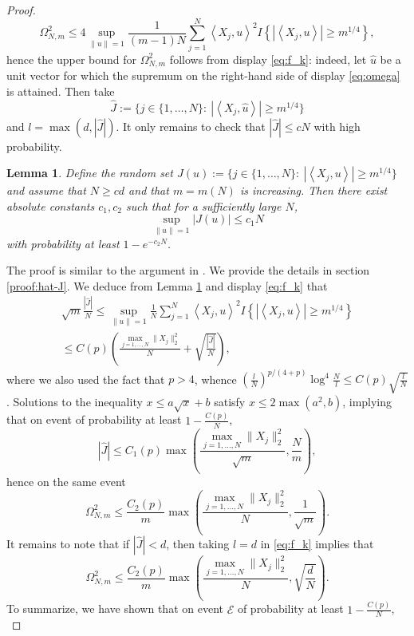 \documentclass[12pt]{article}
\def\l{\left}
\def\r{\right}
\newcommand{\m}{\mathcal}
\newcommand{\dotp}[2]{\left\langle#1,#2\right\rangle}
\newtheorem{lemma}{Lemma}
\theoremstyle{thmstyletwo}%
\theoremstyle{thmstylethree}%
\begin{document}
\begin{proof}
\begin{equation}
    \label{eq:omega}
\Omega^2_{N,m} \leq 4\sup_{\|u\|=1}\frac{1}{(m-1)N}\sum_{j=1}^N \dotp{X_j}{u}^2 I\l\{ |\dotp{X_j}{u}|\geq m^{1/4}\r\},
\end{equation}
hence the upper bound for $\Omega^2_{N,m}$ follows from display \eqref{eq:f_k}: indeed, let $\hat u$ be a unit vector for which the supremum on the right-hand side of display \eqref{eq:omega} is attained. Then take 
\[
\hat J:=\{ j\in\{1,\ldots,N\}: \ |\dotp{X_j}{\hat u}|\geq m^{1/4} \}
\]
and $l=\max(d,|\hat J|)$. It only remains to check that $|\hat J|\leq cN$ with high probability. 
\begin{lemma}
\label{lemma:hat-J}
    Define the random set $J(u):=\{ j\in\{1,\ldots,N\}: \ |\dotp{X_j}{u}|\geq m^{1/4} \}$ and assume that $N\geq cd$ and that $m=m(N)$ is increasing. Then there exist absolute constants $c_1,c_2$ such that for a sufficiently large $N$, 
    \[
    \sup_{\|u\|=1}|J(u)|\leq c_1N
    \]
    with probability at least $1-e^{-c_2N}$.
\end{lemma}
\noindent The proof is similar to the argument in \citep[Theorem 3.1]{jirak2025concentration}. We provide the details in section \ref{proof:hat-J}. We deduce from Lemma \ref{lemma:hat-J} and display \eqref{eq:f_k} that 
\begin{multline*}
    \sqrt{m} \frac{|\hat J|}{N} \leq \sup_{\|u\|=1}\frac{1}{N}\sum_{j=1}^N \dotp{X_j}{u}^2 I\l\{ |\dotp{X_j}{u}|\geq m^{1/4}\r\} 
    \\
    \leq 
C(p)\left(\frac{\max_{j=1,\ldots,N} \|X_j\|_2^2}{N} + \sqrt{\frac{|\hat J|}{N}}\right), 
\end{multline*}
where we also used the fact that $p>4$, whence $\left(\frac{l}{N}\right)^{p/(4+p)} \log^4 \frac{N}{l}\leq C(p) \sqrt{\frac{l}{N}}$. 
Solutions to the inequality $x \leq a\sqrt{x} + b$ satisfy $x\leq 2\max(a^2, b)$, implying that on event of probability at least $1-\frac{C(p)}{N}$,
\[
|\hat J| \leq C_1(p)\max\l(\frac{\max_{j=1,\ldots,N} \|X_j\|_2^2}{\sqrt m}, \frac{N}{m} \r), 
\]
hence on the same event 
\[
\Omega^2_{N,m} \leq \frac{C_2(p)}{m}\max\l(\frac{\max_{j=1,\ldots,N} \|X_j\|_2^2}{N}, \frac{1}{\sqrt m} \r).
\]
It remains to note that if $|\hat J|<d$, then taking $l=d$ in \eqref{eq:f_k} implies that 
\[
\Omega^2_{N,m}\leq \frac{C_2(p)}{m}\max\l(\frac{\max_{j=1,\ldots,N} \|X_j\|_2^2}{N}, \sqrt{\frac{d}{N}}\r).
\]
To summarize, we have shown that on event $\m E$ of probability at least $1-\frac{C(p)}{N}$, 
\begin{equation}
    \label{eq:omega-f}

\end{equation}
\end{proof}
\end{document}
